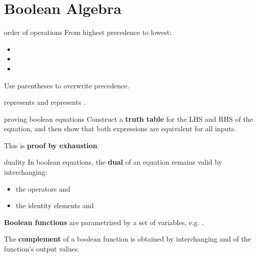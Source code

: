 \section{Boolean Algebra}
\begin{defn}{order of operations}
    From highest precedence to lowest:

    \begin{itemize}
        \item \NOT
        \item \AND
        \item \OR
    \end{itemize}

    Use parentheses to overwrite precedence.
\end{defn}

\textbf{} represents \textbf{} and \textbf{} represents \textbf{}.

\begin{defn}{proving boolean equations}
    Construct a \textbf{truth table} for the LHS and RHS of the equation,
    and then show that both expressions are equivalent for all inputs.
    
    This is \textbf{proof by exhaustion}.
\end{defn}

\begin{defn}{duality}
    In boolean equations, the \textbf{dual} of an equation remains valid by interchanging:
    
    \begin{itemize}
        \item the operators \AND and \OR
        \item the identity elements  and 
    \end{itemize}
\end{defn}

\textbf{Boolean functions} are parametrized by a set of variables,
e.g. .

The \textbf{complement} of a boolean function is obtained by interchanging 
and  of the function's output values.

